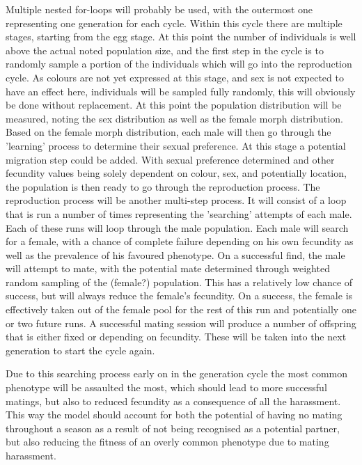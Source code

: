 \documentclass{article}
\begin{document}
Multiple nested for-loops will probably be used, with the outermost one representing one generation for each cycle. Within this cycle there are multiple stages, starting from the egg stage. At this point the number of individuals is well above the actual noted population size, and the first step in the cycle is to randomly sample a portion of the individuals which will go into the reproduction cycle. As colours are not yet expressed at this stage, and sex is not expected to have an effect here, individuals will be sampled fully randomly, this will obviously be done without replacement. At this point the population distribution will be measured, noting the sex distribution as well as the female morph distribution. Based on the female morph distribution, each male will then go through the 'learning' process to determine their sexual preference. At this stage a potential migration step could be added. With sexual preference determined and other fecundity values being solely dependent on colour, sex, and potentially location, the population is then ready to go through the reproduction process. The reproduction process will be another multi-step process. It will consist of a loop that is run a number of times representing the 'searching' attempts of each male. Each of these runs will loop through the male population. Each male will search for a female, with a chance of complete failure depending on his own fecundity as well as the prevalence of his favoured phenotype. On a successful find, the male will attempt to mate, with the potential mate determined through weighted random sampling of the (female?) population. This has a relatively low chance of success, but will always reduce the female's fecundity. On a success, the female is effectively taken out of the female pool for the rest of this run and potentially one or two future runs. A successful mating session will produce a number of offspring that is either fixed or depending on fecundity. These will be taken into the next generation to start the cycle again.

Due to this searching process early on in the generation cycle the most common phenotype will be assaulted the most, which should lead to more successful matings, but also to reduced fecundity as a consequence of all the harassment. This way the model should account for both the potential of having no mating throughout a season as a result of not being recognised as a potential partner, but also reducing the fitness of an overly common phenotype due to mating harassment.
\end{document}

